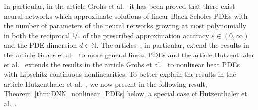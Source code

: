 \documentclass[12pt,AutoFakeBold,AutoFakeSlant]{article}
\theoremstyle{definition}
\newcommand{\N}{\mathbb{N}}
\begin{document}
	In particular, in the article Grohs et al.~\cite{grohs2018proof} it has been proved 
	that there exist neural networks which approximate solutions of linear 
	Black-Scholes PDEs with the number of parameters of the neural networks 
	growing at most polynomially in both 
	the reciprocal $ \nicefrac{ 1 }{ \varepsilon } $ 
	of the prescribed approximation accuracy $ \varepsilon \in (0,\infty) $
	and the PDE dimension $ d \in \N $. 
	The articles~\cite{berner2018analysis,elbrachter2018dnn,gonon2019uniform,grohs2019deep,jentzen2018proofarxiv1809,kutyniok2019theoretical,reisinger2019rectified,HornungJentzenSalimova2020}, 
	in particular, extend 
	the results in the article Grohs et al.~\cite{grohs2018proof}
	to more general linear PDEs and the article 
	Hutzenthaler et al.~\cite{hutzenthaler2020proof} 
	extends the results in the article Grohs et al.~\cite{grohs2018proof}
	to nonlinear heat PDEs with Lipschitz continuous nonlinearities. 
	To better explain the results in the article 
	Hutzenthaler et al.~\cite{hutzenthaler2020proof}, 
	we now present in the following result, 
	Theorem~\ref{thm:DNN_nonlinear_PDEs} below, 
	a special case of 
	Hutzenthaler et 
	al.~\cite[Theorem~1.1]{hutzenthaler2020proof}. 
\end{document}
